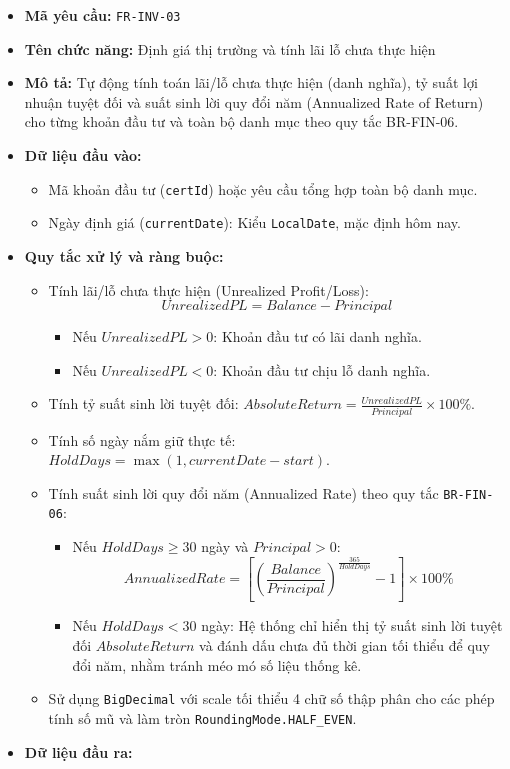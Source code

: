 \documentclass[11pt,a4paper]{article}
\providecommand{\tightlist}{
  \setlength{\itemsep}{0pt}\setlength{\parskip}{0pt}}
\begin{document}
\begin{itemize}
\tightlist
\item
  \textbf{Mã yêu cầu:} \texttt{FR-INV-03}
\item
  \textbf{Tên chức năng:} Định giá thị trường và tính lãi lỗ chưa thực
  hiện
\item
  \textbf{Mô tả:} Tự động tính toán lãi/lỗ chưa thực hiện (danh nghĩa),
  tỷ suất lợi nhuận tuyệt đối và suất sinh lời quy đổi năm (Annualized
  Rate of Return) cho từng khoản đầu tư và toàn bộ danh mục theo quy tắc
  BR-FIN-06.
\item
  \textbf{Dữ liệu đầu vào:}

  \begin{itemize}
  \tightlist
  \item
    Mã khoản đầu tư (\texttt{certId}) hoặc yêu cầu tổng hợp toàn bộ danh
    mục.
  \item
    Ngày định giá (\texttt{currentDate}): Kiểu \texttt{LocalDate}, mặc
    định hôm nay.
  \end{itemize}
\item
  \textbf{Quy tắc xử lý và ràng buộc:}

  \begin{itemize}
  \tightlist
  \item
    Tính lãi/lỗ chưa thực hiện (Unrealized Profit/Loss):
    \[UnrealizedPL = Balance - Principal\]

    \begin{itemize}
    \tightlist
    \item
      Nếu \(UnrealizedPL > 0\): Khoản đầu tư có lãi danh nghĩa.
    \item
      Nếu \(UnrealizedPL < 0\): Khoản đầu tư chịu lỗ danh nghĩa.
    \end{itemize}
  \item
    Tính tỷ suất sinh lời tuyệt đối:
    \(AbsoluteReturn = \frac{UnrealizedPL}{Principal} \times 100\%\).
  \item
    Tính số ngày nắm giữ thực tế:
    \(HoldDays = \max(1, currentDate - start)\).
  \item
    Tính suất sinh lời quy đổi năm (Annualized Rate) theo quy tắc
    \texttt{BR-FIN-06}:

    \begin{itemize}
    \tightlist
    \item
      Nếu \(HoldDays \ge 30\) ngày và \(Principal > 0\):
      \[AnnualizedRate = \left[ \left( \frac{Balance}{Principal} \right)^{\frac{365}{HoldDays}} - 1 \right] \times 100\%\]
    \item
      Nếu \(HoldDays < 30\) ngày: Hệ thống chỉ hiển thị tỷ suất sinh lời
      tuyệt đối \(AbsoluteReturn\) và đánh dấu chưa đủ thời gian tối
      thiểu để quy đổi năm, nhằm tránh méo mó số liệu thống kê.
    \end{itemize}
  \item
    Sử dụng \texttt{BigDecimal} với scale tối thiểu 4 chữ số thập phân
    cho các phép tính số mũ và làm tròn
    \texttt{RoundingMode.HALF\_EVEN}.
  \end{itemize}
\item
  \textbf{Dữ liệu đầu ra:}


\end{itemize}
\end{document}
